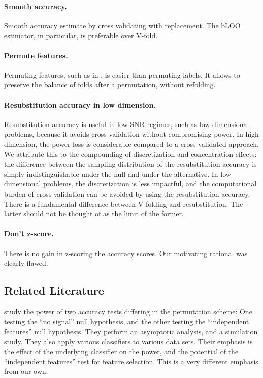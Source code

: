 \documentclass[12pt,a4paper]{article}
\begin{document}
\paragraph{Smooth accuracy.}
Smooth accuracy estimate by cross validating with replacement. The bLOO estimator, in particular, is preferable over V-fold.

\paragraph{Permute features.} Permuting features, such as in \cite{golland_permutation_2005}, is easier than permuting labels. 
It allows to preserve the balance of folds after a permutation, without refolding.

\paragraph{Resubstitution accuracy in low dimension.} Resubstitution accuracy is useful in low SNR regimes, such as low dimensional problems, because it avoids cross validation without compromising power. 
In high dimension, the power loss is considerable compared to a cross validated approach. 
We attribute this to the compounding of discretization and concentration effects: the difference between the sampling distribution of the resubstitution accuracy is simply indistinguishable under the null and under the alternative. 
In low dimensional problems, the discretization is less impactful, and the computational burden of cross validation can be avoided by using the resubstitution accuracy. 
There is a fundamental difference between V-folding and resubstitution. The latter should not be thought of as the limit of the former. 
 

\paragraph{Don't z-score.} There is no gain in z-scoring the accuracy scores. Our motivating rational was clearly flawed. %

















\subsection{Related Literature}
\cite{ojala_permutation_2010} study the power of two accuracy tests differing in the permutation scheme:
One testing the ``no signal'' null hypothesis, and the other testing the ``independent features'' null hypothesis. 
They perform an asymptotic analysis, and a simulation study. 
They also apply various classifiers to various data sets. 
Their emphasis is the effect of the underlying classifier on the power, and the potential of the ``independent features'' test for feature selection.
This is a very different emphasis from our own.
\end{document}
